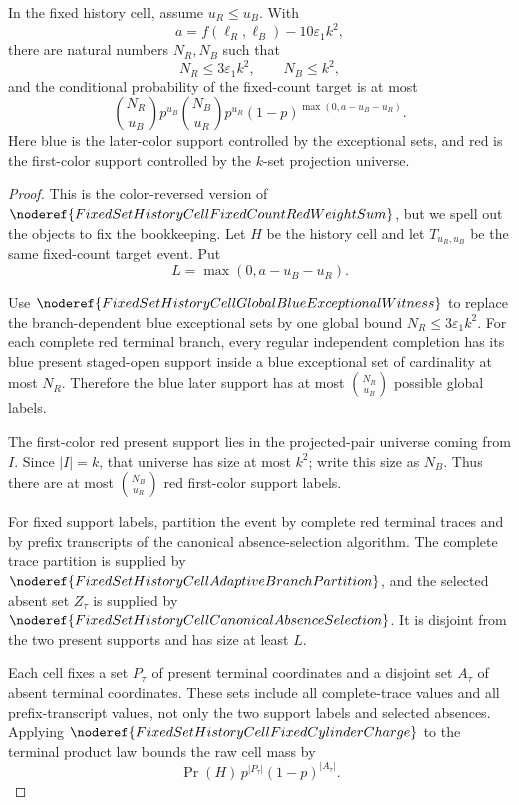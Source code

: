 \begin{helper}
In the fixed history cell, assume \(u_R\le u_B\).  With
\[
a=f(\ell_R,\ell_B)-10\varepsilon_1 k^2,
\]
there are natural numbers \(N_R,N_B\) such that
\[
N_R\le 3\varepsilon_1 k^2,\qquad N_B\le k^2,
\]
and the conditional probability of the fixed-count target is at most
\[
\binom{N_R}{u_B}p^{u_B}\binom{N_B}{u_R}p^{u_R}
(1-p)^{\max(0,a-u_B-u_R)}.
\]
Here blue is the later-color support controlled by the exceptional sets, and
red is the first-color support controlled by the \(k\)-set projection
universe.
\end{helper}
\begin{proof}
This is the color-reversed version of
\(\noderef{FixedSetHistoryCellFixedCountRedWeightSum}\), but we spell out the
objects to fix the bookkeeping.  Let \(H\) be the history cell and let
\(T_{u_R,u_B}\) be the same fixed-count target event.  Put
\[
L=\max(0,a-u_B-u_R).
\]

Use \(\noderef{FixedSetHistoryCellGlobalBlueExceptionalWitness}\) to replace
the branch-dependent blue exceptional sets by one global bound
\(N_R\le3\varepsilon_1k^2\).  For each complete red terminal branch, every
regular independent completion has its blue present staged-open support
inside a blue exceptional set of cardinality at most \(N_R\).  Therefore the
blue later support has at most \(\binom{N_R}{u_B}\) possible global labels.

The first-color red present support lies in the projected-pair universe
coming from \(I\).  Since \(|I|=k\), that universe has size at most \(k^2\);
write this size as \(N_B\).  Thus there are at most
\(\binom{N_B}{u_R}\) red first-color support labels.

For fixed support labels, partition the event by complete red terminal traces
and by prefix transcripts of the canonical absence-selection algorithm.  The
complete trace partition is supplied by
\(\noderef{FixedSetHistoryCellAdaptiveBranchPartition}\), and the selected
absent set \(Z_\tau\) is supplied by
\(\noderef{FixedSetHistoryCellCanonicalAbsenceSelection}\).  It is disjoint
from the two present supports and has size at least \(L\).

Each cell fixes a set \(P_\tau\) of present terminal coordinates and a
disjoint set \(A_\tau\) of absent terminal coordinates.  These sets include
all complete-trace values and all prefix-transcript values, not only the two
support labels and selected absences.  Applying
\(\noderef{FixedSetHistoryCellFixedCylinderCharge}\) to the terminal product
law bounds the raw cell mass by
\[
\Pr(H)\,p^{|P_\tau|}(1-p)^{|A_\tau|}.
\]


\end{proof}
